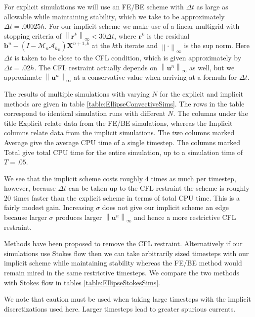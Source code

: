 \documentclass[preprint,12pt]{elsarticle}
\newcommand{\norm}[1]{\left\lVert#1\right\rVert}
\begin{document}
For explicit simulations we will use an FE/BE scheme with $\Delta t$ as large as allowable while maintaining stability, which we take to be approximately $\Delta t = .00025h$. For our implicit scheme we make use of a linear multigrid with stopping criteria of $\norm{\mathbf{r}^k}_{\infty}<30\Delta t$, where $\mathbf{r}^k$ is the residual $\mathbf{b}^n-(I-\mathcal{M}_n\mathcal{A}_{h_B})\mathbf{X}^{n+1,k}$ at the $k$th iterate and $\norm{\cdot}_{\infty}$ is the sup norm. Here $\Delta t$ is taken to be close to the CFL condition, which is given approximately by $\Delta t = .02h$. The CFL restraint actually depends on $\norm{\mathbf{u}^n}_{\infty}$ as well, but we approximate $\norm{\mathbf{u}^n}_{\infty}$ at a conservative value when arriving at a formula for $\Delta t$.

The results of multiple simulations with varying $N$ for the explicit and implicit methods are given in table \ref{table:EllipseConvectiveSims}. The rows in the table correspond to identical simulation runs with different $N$. The columns under the title Explicit relate data from the FE/BE simulations, whereas the Implicit columns relate data from the implicit simulations. The two columns marked Average give the average CPU time of a single timestep. The columns marked Total give total CPU time for the entire simulation, up to a simulation time of $T=.05$.

We see that the implicit scheme costs roughly $4$ times as much per timestep, however, because $\Delta t$ can be taken up to the CFL restraint the scheme is roughly $20$ times faster than the explicit scheme in terms of total CPU time. This is a fairly modest gain. Increasing $\sigma$ does not give our implicit scheme an edge because larger $\sigma$ produces larger $\norm{\mathbf{u}^n}_{\infty}$ and hence a more restrictive CFL restraint.

Methods have been proposed to remove the CFL restraint. Alternatively if our simulations use Stokes flow then we can take arbitrarily sized timesteps with our implicit scheme while maintaining stability whereas the FE/BE method would remain mired in the same restrictive timesteps. We compare the two methods with Stokes flow in tables \ref{table:EllipseStokesSims}.

We note that caution must be used when taking large timesteps with the implicit discretizations used here. Larger timesteps lead to greater spurious currents.
\end{document}
